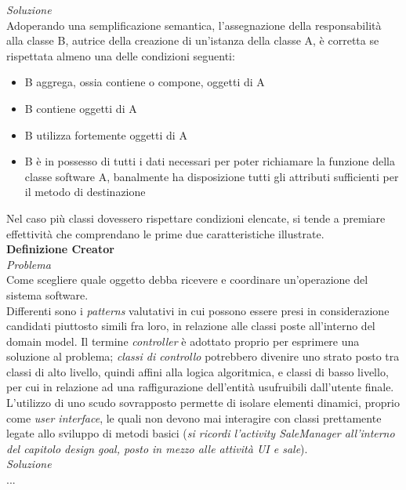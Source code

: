 \documentclass{article}
\begin{document}
\textit{Soluzione}\\
Adoperando una semplificazione semantica, l'assegnazione della responsabilità alla classe B, autrice della creazione di un'istanza della classe A, è corretta se rispettata almeno una delle condizioni seguenti:
\begin{itemize}[label={-}]
    \itemsep0em
    \item B aggrega, ossia contiene o compone, oggetti di A 
    \item B contiene oggetti di A 
    \item B utilizza fortemente oggetti di A
    \item B è in possesso di tutti i dati necessari per poter richiamare la funzione della classe software A, banalmente ha disposizione tutti gli attributi sufficienti per il metodo di destinazione
\end{itemize}
Nel caso più classi dovessero rispettare condizioni elencate, si tende a premiare effettività che comprendano le prime due caratteristiche illustrate.\vspace*{14pt}\\
\textbf{Definizione Creator}\vspace*{7pt}\\
\textit{Problema}\\
Come scegliere quale oggetto debba ricevere e coordinare un'operazione del sistema software.\vspace*{7pt}\\
Differenti sono i \textit{patterns} valutativi in cui possono essere presi in considerazione candidati piuttosto simili fra loro, in relazione alle classi poste all'interno del domain model. Il termine \textit{controller} è adottato proprio per esprimere una soluzione al problema; \textit{classi di controllo} potrebbero divenire uno strato posto tra classi di alto livello, quindi affini alla logica algoritmica, e classi di basso livello, per cui in relazione ad una raffigurazione dell'entità usufruibili dall'utente finale. L'utilizzo di uno scudo sovrapposto permette di isolare elementi dinamici, proprio come \textit{user interface}, le quali non devono mai interagire con classi prettamente legate allo sviluppo di metodi basici (\textit{si ricordi l'activity SaleManager all'interno del capitolo design goal, posto in mezzo alle attività UI e sale}).\vspace*{14pt}\\
\textit{Soluzione}\\
...\vspace*{14pt}\\
\end{document}
